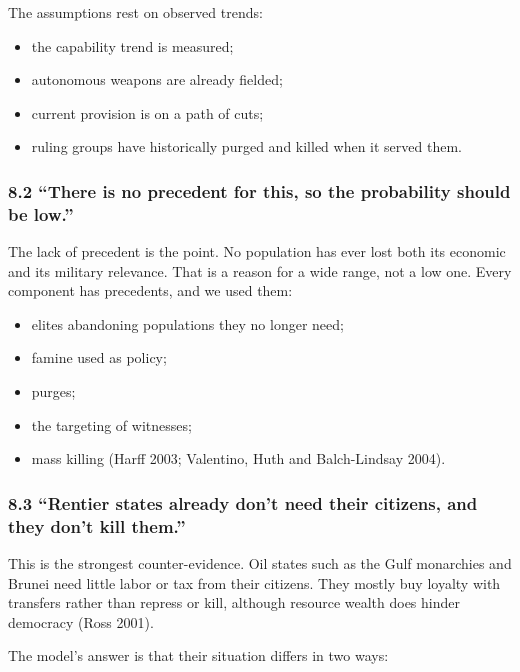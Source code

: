 \documentclass[
  10pt,
]{article}
\providecommand{\tightlist}{%
  \setlength{\itemsep}{0pt}\setlength{\parskip}{0pt}}
\begin{document}
The assumptions rest on observed trends:

\begin{itemize}
\tightlist
\item
  the capability trend is measured;
\item
  autonomous weapons are already fielded;
\item
  current provision is on a path of cuts;
\item
  ruling groups have historically purged and killed when it served them.
\end{itemize}

\subsubsection{8.2 ``There is no precedent for this, so the probability should be
low.''}\label{there-is-no-precedent-for-this-so-the-probability-should-be-low.}

The lack of precedent is the point. No population has ever lost both its economic and its military
relevance. That is a reason for a wide range, not a low one. Every component has precedents, and we
used them:

\begin{itemize}
\tightlist
\item
  elites abandoning populations they no longer need;
\item
  famine used as policy;
\item
  purges;
\item
  the targeting of witnesses;
\item
  mass killing (Harff 2003; Valentino, Huth and Balch-Lindsay 2004).
\end{itemize}

\subsubsection{8.3 ``Rentier states already don't need their citizens, and they don't kill
them.''}\label{rentier-states-already-dont-need-their-citizens-and-they-dont-kill-them.}

This is the strongest counter-evidence. Oil states such as the Gulf monarchies and Brunei need
little labor or tax from their citizens. They mostly buy loyalty with transfers rather than repress
or kill, although resource wealth does hinder democracy (Ross 2001).

The model's answer is that their situation differs in two ways:
\end{document}
